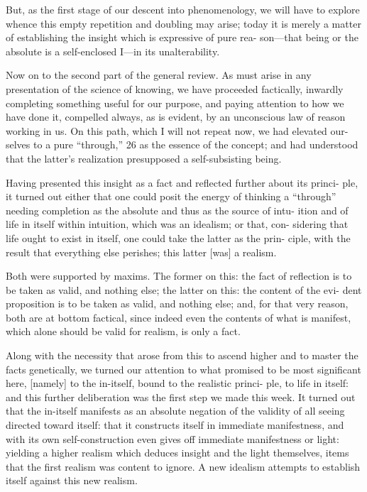 But, as the first stage of our descent into phenomenology, we will have to
explore whence this empty repetition and doubling may arise; today it is
merely a matter of establishing the insight which is expressive of pure rea-
son—that being or the absolute is a self-enclosed I—in its unalterability.

Now on to the second part of the general review.
As must arise in any
presentation of the science of knowing, we have proceeded factically, inwardly
completing something useful for our purpose, and paying attention to how we
have done it, compelled always, as is evident, by an unconscious law of reason
working in us.
On this path, which I will not repeat now, we had elevated our-
selves to a pure “through,” 26 as the essence of the concept; and had understood
that the latter’s realization presupposed a self-subsisting being.

Having presented this insight as a fact and reflected further about its princi-
ple, it turned out either that one could posit the energy of thinking a
“through” needing completion as the absolute and thus as the source of intu-
ition and of life in itself within intuition, which was an idealism; or that, con-
sidering that life ought to exist in itself, one could take the latter as the prin-
ciple, with the result that everything else perishes; this latter [was] a realism.

Both were supported by maxims.
The former on this: the fact of reflection is
to be taken as valid, and nothing else; the latter on this: the content of the evi-
dent proposition is to be taken as valid, and nothing else; and, for that very
reason, both are at bottom factical, since indeed even the contents of what is
manifest, which alone should be valid for realism, is only a fact.

Along with the necessity that arose from this to ascend higher and to
master the facts genetically, we turned our attention to what promised to be
most significant here, [namely] to the in-itself, bound to the realistic princi-
ple, to life in itself: and this further deliberation was the first step
we made this week.
It turned out that the in-itself manifests as an absolute
negation of the validity of all seeing directed toward itself:
that it constructs
itself in immediate manifestness, and with its own self-construction even gives
off immediate manifestness or light: yielding a higher realism which deduces
insight and the light themselves, items that the first realism was content to
ignore.
A new idealism attempts to establish itself against this new realism.

